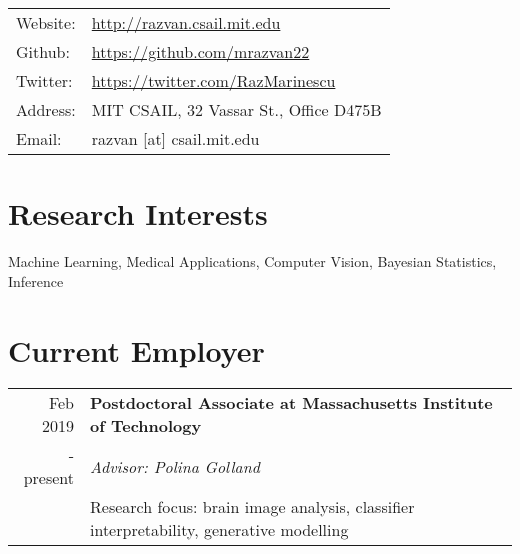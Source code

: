 \documentclass[a4paper,10pt]{article} %
\begin{document}
\pagestyle{empty} %



\par{\bigskip\par}

\begin{tabular}{ll}
 Website: & \url{http://razvan.csail.mit.edu}\\
 Github: & \url{https://github.com/mrazvan22}\\
 Twitter: & \url{https://twitter.com/RazMarinescu}\\
 Address: & MIT CSAIL, 32 Vassar St., Office D475B\\
 Email: & razvan [at] csail.mit.edu\\

\end{tabular}



\vspace{-0.5em}
\section*{Research Interests}
Machine Learning, Medical Applications, Computer Vision, Bayesian Statistics, Inference
\vspace{-0.5em}

\section*{Current Employer}
\begin{tabular}{r|p{15cm}}
Feb 2019 & \large\textbf{Postdoctoral Associate at Massachusetts Institute of Technology} \\
- present & \emph{Advisor: Polina Golland}\\
& Research focus: brain image analysis, classifier interpretability, generative modelling\\
\end{tabular}
\end{document}
